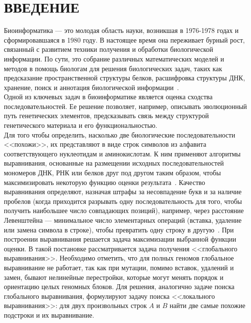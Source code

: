 \newpage
\part*{\large \centering ВВЕДЕНИЕ}
\hspace{\parindent} Биоинформатика --- это молодая область науки, возникшая в 1976-1978 годах и сформировавшаяся в 1980 году. В настоящее время она переживает бурный рост, связанный с развитием техники получения и обработки биологической информации. По сути, это собрание различных математических моделей и методов в помощь биологам для решения биологических задач, таких как предсказание пространственной структуры белков, расшифровка структуры ДНК, хранение, поиск и аннотация биологической информации~\cite{MironovLect}.\\
\indent Одной из ключевых задач в биоинформатике является оценка сходства последовательностей. Ее решение позволяет, например, описывать эволюционный путь генетических элементов, предсказывать связь между структурой генетического материала и его функциональностью.\\
\indent Для того чтобы определить, насколько две биологические последовательности <<похожи>>, их представляют в виде строк символов из алфавита соответствующего нуклеотидам и аминокислотам. К ним применяют алгоритмы выравнивания, основанные на размещении исходных последовательностей мономеров ДНК, РНК или белков друг под другом таким образом, чтобы максимизировать некоторую функцию оценки результата~\cite{WikiPairAlign}. Качество выравнивания определяют, назначая штрафы за несовпадение букв и за наличие пробелов (когда приходится разрывать одну последовательность для того, чтобы получить наибольшее число совпадающих позиций), например, через расстояние Левенштейна --- минимальное число элементарных операций (вставка, удаление или замена символа в строке), чтобы превратить одну строку в другую~\cite{Levenshtein}. При построении выравнивания решается задача максимизации выбранной функции оценки. В такой постановке рассматривается задача получения <<глобального выравнивания>>. Необходимо отметить, что для полных геномов глобальное выравнивание не работает, так как при мутации, помимо вставок, удалений и замен, бывают нелинейные перестройки, которые могут менять порядок и ориентацию целых геномных блоков. Для решения, аналогично задаче поиска глобального выравнивания, формулируют задачу поиска <<локального выравнивания>>: для двух произвольных строк $A$ и $B$ найти две самые похожие подстроки и их выравнивание.\\ 
